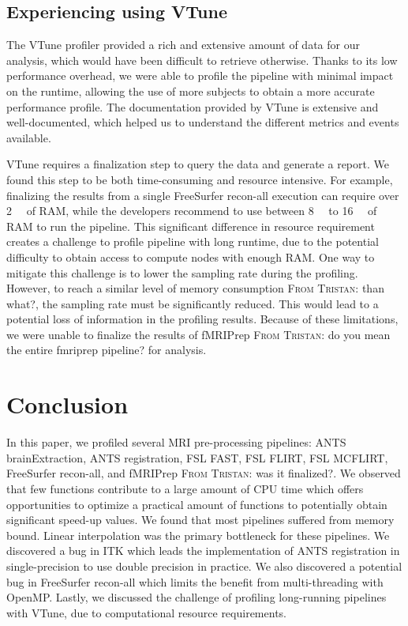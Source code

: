 \documentclass[conference]{IEEEtran}
\newcommand{\TG}[1]{\color{blue}\textsc{From Tristan: }#1\color{black}}
\begin{document}
\subsection{Experiencing using VTune}
The VTune profiler provided a rich and extensive amount of data for our analysis, which would have been difficult to retrieve otherwise. Thanks to its low performance overhead, we were able to profile the pipeline with minimal impact on the runtime, allowing the use of more subjects to obtain a more accurate performance profile. The documentation provided by VTune is extensive and well-documented, which helped us to understand the different metrics and events available.

VTune requires a finalization step to query the data and generate a report. We found this step to be both time-consuming and resource intensive. For example, finalizing the results from a single FreeSurfer recon-all execution can require over \SI{2}{\tera\byte} of RAM, while the developers recommend to use between \SI{8}{\giga\byte} to \SI{16}{\giga\byte} of RAM to run the pipeline. This significant difference in resource requirement creates a challenge to profile pipeline with long runtime, due to the potential difficulty to obtain access to compute nodes with enough RAM. One way to mitigate this challenge is to lower the sampling rate during the profiling. However, to reach a similar level of memory consumption \TG{than what?}, the sampling rate must be significantly reduced. This would lead to a potential loss of information in the profiling results.
Because of these limitations, we were unable to finalize the results of fMRIPrep \TG{do you mean the entire fmriprep pipeline?} for analysis.

\section{Conclusion}
In this paper, we profiled several MRI pre-processing pipelines: ANTS brainExtraction, ANTS registration, FSL FAST, FSL FLIRT, FSL MCFLIRT, FreeSurfer recon-all, and fMRIPrep \TG{was it finalized?}. We observed that few functions contribute to a large amount of CPU time which offers opportunities to optimize a practical amount of functions to potentially obtain significant speed-up values. We found that most pipelines suffered from memory bound. Linear interpolation was the primary bottleneck for these pipelines. We discovered a bug in ITK which leads the implementation of ANTS registration in single-precision to use double precision in practice. We also discovered a potential bug in FreeSurfer recon-all which limits the benefit from multi-threading with OpenMP. Lastly, we discussed the challenge of profiling long-running pipelines with VTune, due to computational resource requirements.
\end{document}
